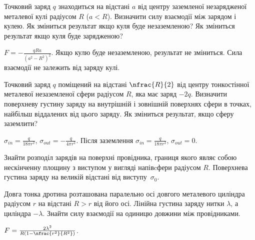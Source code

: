 


\begin{problem}
Точковий заряд $q$ знаходиться на відстані $a$ від центру заземленої незарядженої металевої кулі радіусом $R$ ($ a < R$). Визначити силу взаємодії між зарядом і кулею. Як зміниться результат якщо куля буде незаземленою? Як зміниться результат якщо куля буде зарядженою?
\begin{solution}
	$F = -\frac{qRa}{(a^2 - R^2)^2}$. Якщо кулю буде незаземленою, результат не зміниться. Сила взаємодії не залежить від заряду кулі.
\end{solution}
\end{problem}


\begin{problem} %
Точковий заряд $q$ поміщений на відстані $\nfrac{R}{2}$ від центру тонкостінної металевої незаземленої сфери радіусом $R$, яка має заряд $-2q$. Визначити поверхневу густину заряду на внутрішній і зовнішній поверхнях сфери в точках, найбільш віддалених від цього заряду. Як зміниться результат, якщо сферу заземлити?
\begin{solution}
	$\sigma_{in} = \frac{q}{18\pi r^2}$, $\sigma_{out} = - \frac{q}{4\pi r^2}$. Після заземлення $\sigma_{in} = \frac{q}{18\pi r^2}$, $\sigma_{out} = 0$.
\end{solution}
\end{problem}

\begin{problem}
Знайти розподіл зарядів на поверхні провідника, границя якого являє собою нескінченну площину з виступом у вигляді напівcфери радіусом $R$. Поверхнева густина заряду на великій відстані від виступу~$\sigma_0$.
\end{problem}

\begin{problem}
Довга тонка дротина розташована паралельно осі довгого металевого циліндра радіусом $r$ на відстані $R > r$ від його осі. Лінійна густина заряду нитки $\lambda$, а циліндра $-\lambda$. Знайти силу взаємодії на одиницю довжини між провідниками.
\begin{solution}
	$F = \frac{2\lambda^2}{R\left( 1 - \nfrac{r^2}{R^2}\right) }$.
\end{solution}
\end{problem}

